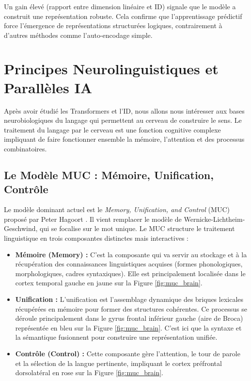 Un gain élevé (rapport entre dimension linéaire et ID) signale que le modèle a construit une représentation robuste. Cela confirme que l'apprentissage prédictif force l'émergence de représentations structurées logiques, contrairement à d'autres méthodes comme l'auto-encodage simple.

\section{Principes Neurolinguistiques et Parallèles IA}

Après avoir étudié les Transformers et l'ID, nous allons nous intéresser aux bases neurobiologiques du langage qui permettent au cerveau de construire le sens. Le traitement du langage par le cerveau est une fonction cognitive complexe impliquant de faire fonctionner ensemble la mémoire, l’attention et des processus combinatoires.

\subsection{Le Modèle MUC : Mémoire, Unification, Contrôle}
Le modèle dominant actuel est le \textit{Memory, Unification, and Control} (MUC) proposé par Peter Hagoort \cite{hagoort2013memory}. Il vient remplacer le modèle de Wernicke-Lichtheim-Geschwind, qui se focalise sur le mot unique. Le MUC structure le traitement linguistique en trois composantes distinctes mais interactives :

\begin{itemize}
    \item \textbf{Mémoire (Memory) :} C’est la composante qui va servir au stockage et à la récupération des connaissances linguistiques acquises (formes phonologiques, morphologiques, cadres syntaxiques). Elle est principalement localisée dans le cortex temporal gauche en jaune sur la Figure \ref{fig:muc_brain}.
    \item \textbf{Unification :} L'unification est l'assemblage dynamique des briques lexicales récupérées en mémoire pour former des structures cohérentes. Ce processus se déroule principalement dans le gyrus frontal inférieur gauche (aire de Broca) représentée en bleu sur la Figure \ref{fig:muc_brain}. C'est ici que la syntaxe et la sémantique fusionnent pour construire une représentation unifiée. 
    \item \textbf{Contrôle (Control) :} Cette composante gère l'attention, le tour de parole et la sélection de la langue pertinente, impliquant le cortex préfrontal dorsolatéral en rose sur la Figure \ref{fig:muc_brain}.
\end{itemize}

